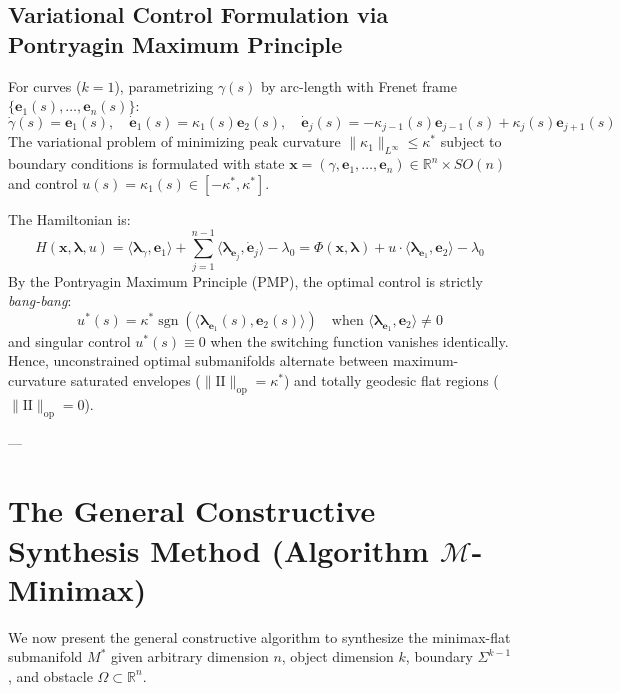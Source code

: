 \documentclass[11pt,reqno]{amsart}
\theoremstyle{definition}
\providecommand{\R}{\mathbb{R}}
\providecommand{\II}{\mathrm{I\!I}}
\newcommand{\op}{\mathrm{op}}
\numberwithin{equation}{section}
\providecommand{\II}{\mathrm{II}}
\providecommand{\R}{\mathbb{R}}
\begin{document}
\subsection{Variational Control Formulation via Pontryagin Maximum Principle}
For curves ($k=1$), parametrizing $\gamma(s)$ by arc-length with Frenet frame $\{\mathbf{e}_1(s), \dots, \mathbf{e}_n(s)\}$:
\begin{equation}
\label{eq:frenet_system}
\dot{\gamma}(s) = \mathbf{e}_1(s), \quad \dot{\mathbf{e}}_1(s) = \kappa_1(s) \mathbf{e}_2(s), \quad \dot{\mathbf{e}}_j(s) = -\kappa_{j-1}(s) \mathbf{e}_{j-1}(s) + \kappa_j(s) \mathbf{e}_{j+1}(s)
\end{equation}
The variational problem of minimizing peak curvature $\|\kappa_1\|_{L^\infty} \le \kappa^*$ subject to boundary conditions is formulated with state $\mathbf{x} = (\gamma, \mathbf{e}_1, \dots, \mathbf{e}_n) \in \R^n \times SO(n)$ and control $u(s) = \kappa_1(s) \in [-\kappa^*, \kappa^*]$.

The Hamiltonian is:
\begin{equation}
H(\mathbf{x}, \boldsymbol{\lambda}, u) = \langle \boldsymbol{\lambda}_\gamma, \mathbf{e}_1 \rangle + \sum_{j=1}^{n-1} \langle \boldsymbol{\lambda}_{\mathbf{e}_j}, \dot{\mathbf{e}}_j \rangle - \lambda_0 = \Phi(\mathbf{x}, \boldsymbol{\lambda}) + u \cdot \langle \boldsymbol{\lambda}_{\mathbf{e}_1}, \mathbf{e}_2 \rangle - \lambda_0
\end{equation}
By the Pontryagin Maximum Principle (PMP), the optimal control is strictly \emph{bang-bang}:
\begin{equation}
u^*(s) = \kappa^* \operatorname{sgn}\left( \langle \boldsymbol{\lambda}_{\mathbf{e}_1}(s), \mathbf{e}_2(s) \rangle \right) \quad \text{when } \langle \boldsymbol{\lambda}_{\mathbf{e}_1}, \mathbf{e}_2 \rangle \neq 0
\end{equation}
and singular control $u^*(s) \equiv 0$ when the switching function vanishes identically. Hence, unconstrained optimal submanifolds alternate between maximum-curvature saturated envelopes ($\|\II\|_{\op} = \kappa^*$) and totally geodesic flat regions ($\|\II\|_{\op} = 0$).

---

\section{The General Constructive Synthesis Method (Algorithm \texorpdfstring{$\mathcal{M}$}{M}-Minimax)}

We now present the general constructive algorithm to synthesize the minimax-flat submanifold $M^*$ given arbitrary dimension $n$, object dimension $k$, boundary $\Sigma^{k-1}$, and obstacle $\Omega \subset \R^n$.
\end{document}
